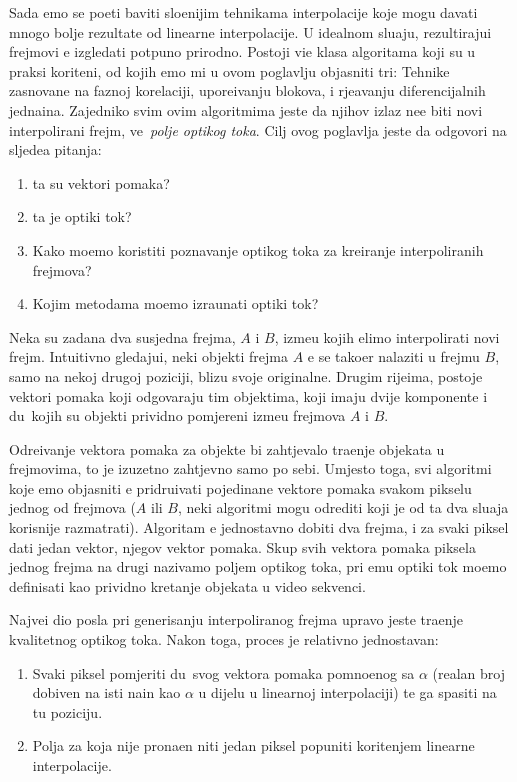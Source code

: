 Sada \cj emo se po\ch eti baviti slo\zh enijim tehnikama interpolacije koje mogu davati mnogo bolje rezultate od linearne interpolacije. U idealnom slu\ch aju, rezultiraju\cj i frejmovi \cj e izgledati potpuno prirodno.
Postoji vi\sh e klasa algoritama koji su u praksi kori\sh teni, od kojih \cj emo mi u ovom poglavlju objasniti tri: Tehnike zasnovane na faznoj korelaciji, upore\dj ivanju blokova, i rje\sh avanju diferencijalnih jedna\ch ina. %
Zajedni\ch ko svim ovim algoritmima jeste da njihov izlaz ne\cj e biti novi interpolirani frejm, ve\cj\ \textit{polje opti\ch kog toka}\cite{wikioptflow}.
Cilj ovog poglavlja jeste da odgovori na sljede\cj a pitanja:
\begin{enumerate}
\item \SH ta su vektori pomaka?
\item \SH ta je opti\ch ki tok?
\item Kako mo\zh emo koristiti poznavanje opti\ch kog toka za kreiranje interpoliranih frejmova?
\item Kojim metodama mo\zh emo izra\ch unati opti\ch ki tok?
\end{enumerate}

Neka su zadana dva susjedna frejma, $A$ i $B$, izme\dj u kojih \zh elimo interpolirati novi frejm. Intuitivno gledaju\cj i, neki objekti frejma $A$ \cj e se tako\dj er nalaziti u frejmu $B$, samo na nekoj drugoj poziciji, blizu
svoje originalne. Drugim rije\ch ima, postoje vektori pomaka koji odgovaraju tim objektima, koji imaju dvije komponente i du\zh\ kojih su objekti prividno pomjereni izme\dj u frejmova $A$ i $B$.

Odre\dj ivanje vektora pomaka za objekte bi zahtjevalo tra\zh enje objekata u frejmovima, \sh to je izuzetno zahtjevno samo po sebi. Umjesto toga, svi algoritmi koje \cj emo objasniti \cj e pridru\zh ivati pojedina\ch ne
vektore pomaka svakom pikselu jednog od frejmova ($A$ ili $B$, neki algoritmi mogu odrediti koji je od ta dva slu\ch aja korisnije razmatrati). Algoritam \cj e jednostavno dobiti dva frejma, i za svaki piksel dati jedan
vektor, njegov vektor pomaka. Skup svih vektora pomaka piksela jednog frejma na drugi nazivamo poljem opti\ch kog toka, pri \ch emu opti\ch ki tok mo\zh emo definisati kao prividno kretanje objekata u video
sekvenci.

Najve\cj i dio posla pri generisanju interpoliranog frejma upravo jeste tra\zh enje kvalitetnog opti\ch kog toka. Nakon toga, proces je relativno jednostavan:
\begin{enumerate}
\item Svaki piksel pomjeriti du\zh\ svog vektora pomaka pomno\zh enog sa $\alpha$ (realan broj dobiven na isti na\ch in kao $\alpha$ u dijelu u linearnoj interpolaciji) te ga spasiti na tu poziciju.
\item Polja za koja nije prona\dj en niti jedan piksel popuniti kori\sh tenjem linearne interpolacije\cite{mefi}.
\end{enumerate}

